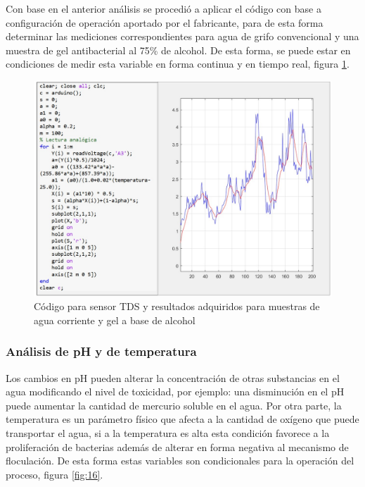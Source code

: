 \documentclass[conference]{IEEEtran}
\begin{document}
Con base en el anterior análisis se procedió a aplicar el código con base a configuración de operación aportado por el fabricante, para de esta forma determinar las mediciones correspondientes para agua de grifo convencional y una muestra de gel antibacterial al 75\% de alcohol. De esta forma, se puede estar en condiciones de medir esta variable en forma continua y en tiempo real, figura \ref{fig:15}.

\begin{figure}[htbp]
	\centering
	\includegraphics[width=0.8\columnwidth]{fig15.jpg}
	\caption{Código para sensor TDS y resultados adquiridos para muestras de agua corriente y gel a base de alcohol}
	\label{fig:15}
\end{figure}

\subsubsection{Análisis de pH y de temperatura}

Los cambios en pH pueden alterar la concentración de otras substancias en el agua modificando el nivel de toxicidad, por ejemplo: una disminución en el pH puede aumentar la cantidad de mercurio soluble en el agua. Por otra parte, la temperatura es un parámetro físico que afecta a la cantidad de oxígeno que puede transportar el agua, si a la temperatura es alta esta condición favorece a la proliferación de bacterias además de alterar en forma negativa al mecanismo de floculación. De esta forma estas variables son condicionales para la operación del proceso, figura \ref{fig:16}.
\end{document}
